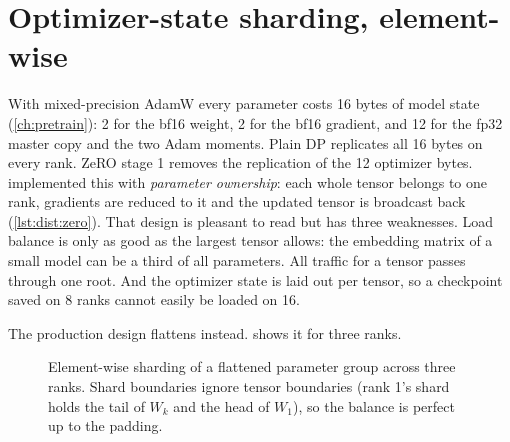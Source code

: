 \section{Optimizer-state sharding, element-wise}\label{sec:sharding:zero}

With mixed-precision AdamW every parameter costs 16 bytes of model state (\cref{ch:pretrain}):
2 for the bf16 weight, 2 for the bf16 gradient, and 12 for the fp32 master copy and the two Adam
moments. Plain DP replicates all 16 bytes on every rank. ZeRO stage 1 removes the replication of
the 12 optimizer bytes.  implemented this with \emph{parameter ownership}:
each whole tensor belongs to one rank, gradients are reduced to it and the updated tensor is
broadcast back (\cref{lst:dist:zero}). That design is pleasant to read but has three weaknesses.
Load balance is only as good as the largest tensor allows: the embedding matrix of a small model
can be a third of all parameters. All traffic for a tensor passes through one root. And the
optimizer state is laid out per tensor, so a checkpoint saved on 8 ranks cannot easily be loaded on 16.

The production design flattens instead.  shows it for three ranks.

\begin{figure}[t]
\centering
{}
\caption{Element-wise sharding of a flattened parameter group across three ranks. Shard boundaries
ignore tensor boundaries (rank 1's shard holds the tail of $W_k$ and the head of $W_1$), so the
balance is perfect up to the padding.}
\label{fig:sharding:flat}
\end{figure}

